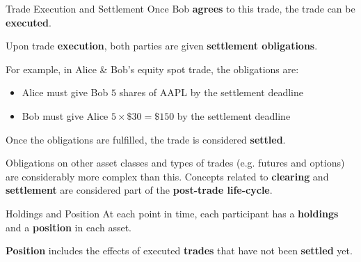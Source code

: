 \begin{frame}{Trade Execution and Settlement}
  Once Bob \textbf{agrees} to this trade, the trade can be \textbf{executed}.

  \begin{sqt:definition}
    Upon trade \textbf{execution}, both parties are given \textbf{settlement obligations}.
  \end{sqt:definition}
  \begin{sqt:tip}
    For example, in Alice \& Bob's equity spot trade, the obligations are:
    \begin{itemize}
      \item Alice must give Bob $5$ shares of AAPL by the settlement deadline
      \item Bob must give Alice $5\times \$30 = \$150$ by the settlement deadline
    \end{itemize}
    Once the obligations are fulfilled, the trade is considered \textbf{settled}.
  \end{sqt:tip}

  Obligations on other asset classes and types of trades (e.g. futures and options)
  are considerably more complex than this.
  Concepts related to \textbf{clearing} and \textbf{settlement} are
  considered part of the \textbf{post-trade life-cycle}.
\end{frame}

\begin{frame}{Holdings and Position}
  At each point in time, each participant has a \textbf{holdings} and a \textbf{position} in each asset.
  \begin{sqt:definition}
    \textbf{Position} includes the effects of executed \textbf{trades} that have not been \textbf{settled} yet.
  \end{sqt:definition}

  \begin{center}
    
  \end{center}
\end{frame}

